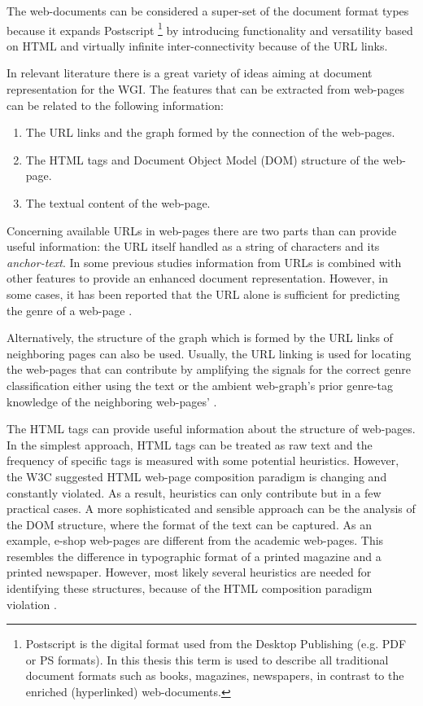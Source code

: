 The web-documents can be considered a super-set of the document format types because it expands Postscript \footnote{Postscript is the digital format used from the Desktop Publishing (e.g. PDF or PS formats). In this thesis this term is used to describe all traditional document formats such as books, magazines, newspapers, in contrast to the enriched (hyperlinked) web-documents.} by introducing functionality and versatility based on HTML and virtually infinite inter-connectivity because of the URL links. 

In relevant literature there is a great variety of ideas aiming at document representation for the WGI. The features that can be extracted from web-pages can be related to the following information:

\begin{enumerate}
\item The URL links and the graph formed by the connection of the web-pages.
\item The HTML tags and Document Object Model (DOM) structure of the web-page. 
\item The textual content of the web-page.
\end{enumerate}

Concerning available URLs in web-pages there are two parts than can provide useful information: the URL itself handled as a string of characters and its \textit{anchor-text}. In some previous studies information from URLs is combined with other features to provide an enhanced document representation. However, in some cases, it has been reported that the URL alone is sufficient for predicting the genre of a web-page \parencite{abramson2012_URL,asheghi2014semi,jebari2014pure_URL,priyatam2013don_URL,zhu2011enhance}.

Alternatively, the structure of the graph which is formed by the URL links of neighboring pages can also be used. Usually, the URL linking is used for locating the web-pages that can contribute by amplifying the signals for the correct genre classification either using the text or the ambient web-graph's prior genre-tag knowledge of the neighboring web-pages' \parencite{abramson2012_URL,asheghi2014semi,jebari2014pure_URL,priyatam2013don_URL,zhu2011enhance}.

The HTML tags can provide useful information about the structure of web-pages. In the simplest approach, HTML tags can be treated as raw text and the frequency of specific tags is measured with some potential heuristics. However, the W3C suggested HTML web-page composition paradigm is changing and constantly violated. As a result, heuristics can only contribute but in a few practical cases. A more sophisticated and sensible approach can be the analysis of the DOM structure, where the format of the text can be captured. As an example, e-shop web-pages are different from the academic web-pages. This resembles the difference in typographic format of a printed magazine and a printed newspaper. However, most likely several heuristics are needed for identifying these structures, because of the HTML composition paradigm violation \parencite{mehler2011integrating,mehler2011integrating}.

